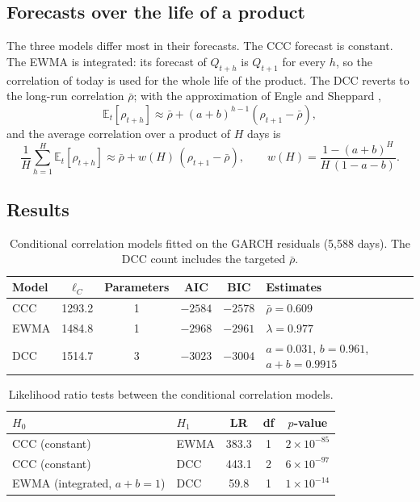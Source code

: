 \documentclass[11pt,a4paper]{article}
\newcommand{\E}{\mathbb{E}}
\begin{document}
\subsection{Forecasts over the life of a product}
The three models differ most in their forecasts. The CCC forecast is constant. The EWMA is integrated: its forecast
of $Q_{t+h}$ is $Q_{t+1}$ for every $h$, so the correlation of today is used for the whole life of the product. The
DCC reverts to the long-run correlation $\bar\rho$; with the approximation of Engle and Sheppard
\cite{englesheppard2001},
\begin{equation}\label{eq:dcc-forecast}
\E_t[\rho_{t+h}] \approx \bar\rho + (a + b)^{h-1}(\rho_{t+1} - \bar\rho),
\end{equation}
and the average correlation over a product of $H$ days is
\begin{equation}\label{eq:dcc-average}
\frac1H \sum_{h=1}^H \E_t[\rho_{t+h}] \approx \bar\rho + w(H)\,(\rho_{t+1} - \bar\rho), \qquad
w(H) = \frac{1 - (a+b)^H}{H\,(1 - a - b)}.
\end{equation}

\subsection{Results}
\begin{table}[h]
\centering
\begin{tabular}{@{}lccccl@{}}
\toprule
Model & $\ell_C$ & Parameters & AIC & BIC & Estimates \\
\midrule
CCC  & 1293.2 & 1 & $-2584$ & $-2578$ & $\bar\rho = 0.609$ \\
EWMA & 1484.8 & 1 & $-2968$ & $-2961$ & $\lambda = 0.977$ \\
DCC  & 1514.7 & 3 & $-3023$ & $-3004$ & $a = 0.031$, $b = 0.961$, $a + b = 0.9915$ \\
\bottomrule
\end{tabular}
\caption{Conditional correlation models fitted on the GARCH residuals (5{,}588 days). The DCC count includes the
targeted $\bar\rho$.}
\label{tab:dcc}
\end{table}

\begin{table}[h]
\centering
\begin{tabular}{@{}llccc@{}}
\toprule
$H_0$ & $H_1$ & LR & df & $p$-value \\
\midrule
CCC (constant)             & EWMA & 383.3 & 1 & $2\times10^{-85}$ \\
CCC (constant)             & DCC  & 443.1 & 2 & $6\times10^{-97}$ \\
EWMA (integrated, $a+b=1$) & DCC  & 59.8  & 1 & $1\times10^{-14}$ \\
\bottomrule
\end{tabular}
\caption{Likelihood ratio tests between the conditional correlation models.}
\label{tab:lr}
\end{table}
\end{document}
